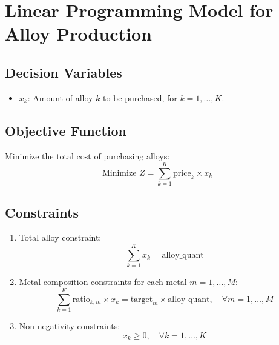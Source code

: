 \documentclass{article}
\begin{document}
\section*{Linear Programming Model for Alloy Production}

\subsection*{Decision Variables}
\begin{itemize}
    \item \( x_k \): Amount of alloy \( k \) to be purchased, for \( k = 1, \ldots, K \).
\end{itemize}

\subsection*{Objective Function}
Minimize the total cost of purchasing alloys:
\[
\text{Minimize } Z = \sum_{k=1}^{K} \text{price}_k \times x_k
\]

\subsection*{Constraints}
\begin{enumerate}
    \item Total alloy constraint:
    \[
    \sum_{k=1}^{K} x_k = \text{alloy\_quant}
    \]

    \item Metal composition constraints for each metal \( m = 1, \ldots, M \):
    \[
    \sum_{k=1}^{K} \text{ratio}_{k,m} \times x_k = \text{target}_m \times \text{alloy\_quant}, \quad \forall m = 1, \ldots, M
    \]

    \item Non-negativity constraints:
    \[
    x_k \geq 0, \quad \forall k = 1, \ldots, K
    \]
\end{enumerate}
\end{document}
